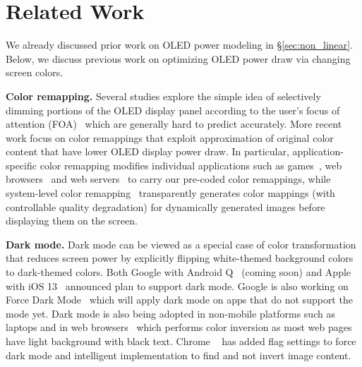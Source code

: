 \section{Related Work}
\label{sec:related}

We already discussed prior work on OLED power modeling in
\S\ref{sec:non_linear}. Below, we discuss previous work on optimizing
OLED power draw via changing screen colors.

{\bf Color remapping.}
Several studies explore the simple idea of selectively dimming portions
of the OLED display panel according to the user's focus of attention
(FOA)~\cite{tan:ubicom13,chen:hotpower14} which are generally hard to
predict accurately.
%
More recent work focus on color remappings that exploit
approximation of original color content that have lower OLED display
power draw. In particular, application-specific color remapping
modifies individual applications such as games~\cite{anand:mobisys11},
web browsers~\cite{dong:ispled09,li:esec15} and web
servers~\cite{li:icse2014} to carry our pre-coded color remappings,
while system-level color remapping~\cite{crayon:eurosys16}
transparently generates color mappings (with controllable
quality degradation) for dynamically generated images before
displaying them on the screen.

{\bf Dark mode.}
Dark mode can be viewed as a special case
of color transformation that reduces screen power
by explicitly flipping white-themed background colors to dark-themed colors.
Both Google with Android Q~\cite{darkmode:androidQ} (coming soon) and
Apple with iOS 13~\cite{darkmode:iOS13_1,darkmode:iOS13_2} announced
plan to support dark mode.  Google is also working on Force Dark
Mode~\cite{darkmode:forcedark} which will apply dark mode on apps
that do not support the mode yet.
%
Dark mode is also being adopted in non-mobile platforms such as
laptops and in web browsers~\cite{darkmode:web_browsers} which
performs color inversion as most web pages have light
background with black text.
Chrome ~\cite{darkmode:chrome} has added flag settings to force dark mode
and intelligent implementation to find and not invert image content.
